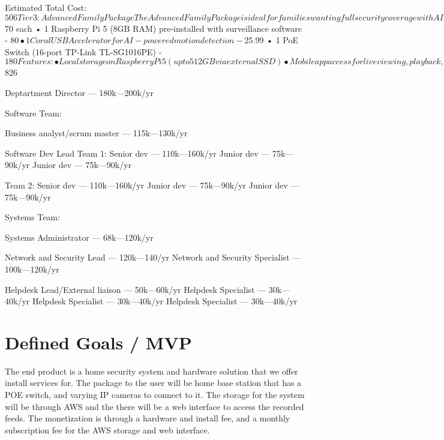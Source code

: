 \documentclass{report}
\begin{document}
Estimated Total Cost: $506
Tier 3: Advanced Family Package
The Advanced Family Package is ideal for families wanting full security coverage with AI-based surveillance features and cloud storage options. This package includes six cameras that can be used in any combination of indoor or outdoor settings.
Components:
• 6 Indoor/Outdoor PoE Cameras (Reolink 5MP, 2560x1920 resolution, 30 fps) - $70 each
• 1 Raspberry Pi 5 (8GB RAM) pre-installed with surveillance software - $80
• 1 Coral USB Accelerator for AI-powered motion detection - $25.99
• 1 PoE Switch (16-port TP-Link TL-SG1016PE) - $180
Features:
• Local storage on Raspberry Pi 5 (up to 512GB via external SSD)
• Mobile app access for live viewing, playback, and two-way audio
• AI-powered motion detection and object recognition using Coral USB Accelerator
• Optional cloud storage integration with AWS
Estimated Total Cost: $826


Deptartment Director — 180k—200k/yr

Software Team:

    Business analyst/scrum master — 115k—130k/yr

    Software Dev Lead
        Team 1:
    Senior dev — 110k—160k/yr
        Junior dev — 75k—90k/yr
        Junior dev — 75k—90k/yr
        
        Team 2:
        Senior dev — 110k—160k/yr
        Junior dev — 75k—90k/yr
        Junior dev — 75k—90k/yr


Systems Team:

    Systems Administrator — 68k—120k/yr

    Network and Security Lead — 120k—140/yr
        Network and Security Specialist — 100k—120k/yr
        
    Helpdesk Lead/External liaison — 50k—60k/yr
        Helpdesk Specialist — 30k—40k/yr
        Helpdesk Specialist — 30k—40k/yr
        Helpdesk Specialist — 30k—40k/yr



\chapter{Defined Goals / MVP}
The end product is a home security system and hardware solution that we offer install services for. 
The package to the user will be home base station that has a POE switch, and varying IP cameras to connect to it. 
The storage for the system will be through AWS and the there will be a web interface to access the recorded feeds. 
The monetization is through a hardware and install fee, and a monthly subscription fee for the AWS storage and web interface. 
\end{document}
